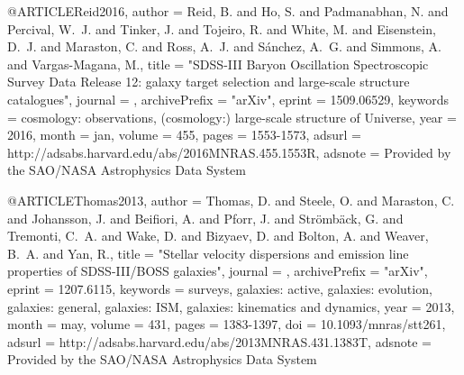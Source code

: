 @ARTICLE{Reid2016,
   author = {{Reid}, B. and {Ho}, S. and {Padmanabhan}, N. and {Percival}, W.~J. and 
	{Tinker}, J. and {Tojeiro}, R. and {White}, M. and {Eisenstein}, D.~J. and 
	{Maraston}, C. and {Ross}, A.~J. and {S{\'a}nchez}, A.~G. and 
	{Simmons}, A. and {Vargas-Magana}, M.},
    title = "{SDSS-III Baryon Oscillation Spectroscopic Survey Data Release 12: galaxy target selection and large-scale structure catalogues}",
  journal = {\mnras},
archivePrefix = "arXiv",
   eprint = {1509.06529},
 keywords = {cosmology: observations, (cosmology:) large-scale structure of Universe},
     year = 2016,
    month = jan,
   volume = 455,
    pages = {1553-1573},
   adsurl = {http://adsabs.harvard.edu/abs/2016MNRAS.455.1553R},
  adsnote = {Provided by the SAO/NASA Astrophysics Data System}
}


@ARTICLE{Thomas2013,
   author = {{Thomas}, D. and {Steele}, O. and {Maraston}, C. and {Johansson}, J. and 
	{Beifiori}, A. and {Pforr}, J. and {Str{\"o}mb{\"a}ck}, G. and 
	{Tremonti}, C.~A. and {Wake}, D. and {Bizyaev}, D. and {Bolton}, A. and 
	{Weaver}, B.~A. and {Yan}, R.},
    title = "{Stellar velocity dispersions and emission line properties of SDSS-III/BOSS galaxies}",
  journal = {\mnras},
archivePrefix = "arXiv",
   eprint = {1207.6115},
 keywords = {surveys, galaxies: active, galaxies: evolution, galaxies: general, galaxies: ISM, galaxies: kinematics and dynamics},
     year = 2013,
    month = may,
   volume = 431,
    pages = {1383-1397},
      doi = {10.1093/mnras/stt261},
   adsurl = {http://adsabs.harvard.edu/abs/2013MNRAS.431.1383T},
  adsnote = {Provided by the SAO/NASA Astrophysics Data System}
}


